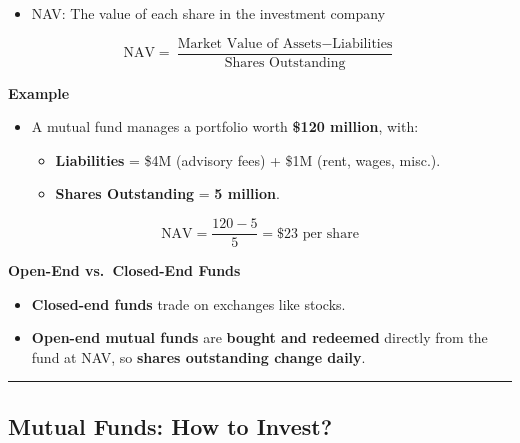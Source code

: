 \documentclass[
  letterpaper,
  DIV=11,
  numbers=noendperiod]{scrartcl}
\providecommand{\tightlist}{%
  \setlength{\itemsep}{0pt}\setlength{\parskip}{0pt}}\usepackage{longtable,booktabs,array}
\begin{document}
\begin{itemize}
\tightlist
\item
  NAV: The value of each share in the investment company
\end{itemize}

\[
\text{NAV} = \frac{\text{Market Value of Assets} - \text{Liabilities}}{\text{Shares Outstanding}}
\]

\textbf{Example}

\begin{itemize}
\tightlist
\item
  A mutual fund manages a portfolio worth \textbf{\$120 million}, with:

  \begin{itemize}
  \tightlist
  \item
    \textbf{Liabilities} = \$4M (advisory fees) + \$1M (rent, wages,
    misc.).
  \item
    \textbf{Shares Outstanding} = \textbf{5 million}.
  \end{itemize}
\end{itemize}

\[
\text{NAV} = \frac{120 - 5}{5} = \$23 \text{ per share}
\]

\textbf{Open-End vs.~Closed-End Funds}

\begin{itemize}
\tightlist
\item
  \textbf{Closed-end funds} trade on exchanges like stocks.
\item
  \textbf{Open-end mutual funds} are \textbf{bought and redeemed}
  directly from the fund at NAV, so \textbf{shares outstanding change
  daily}.
\end{itemize}

\begin{center}\rule{0.5\linewidth}{0.5pt}\end{center}

\subsection{Mutual Funds: How to
Invest?}\label{mutual-funds-how-to-invest}
\end{document}
